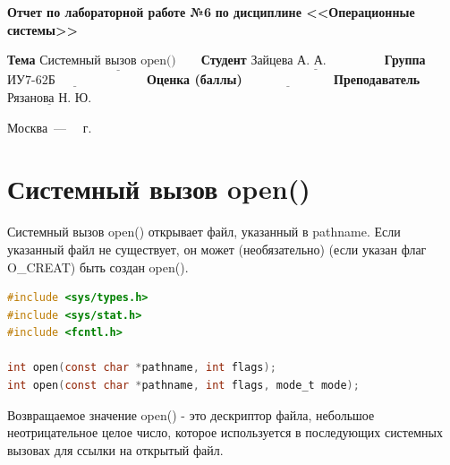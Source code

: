 \documentclass[a4paper,14pt]{extreport}
\begin{document}
\begin{titlepage}
		\begin{center}
			\noindent\begin{minipage}{1.1\textwidth}\centering
				\Large\textbf{  Отчет по лабораторной работе №6}\newline
				\textbf{по дисциплине <<Операционные системы>>}\newline
			\end{minipage}
		\end{center}
		
		\noindent\textbf{Тема} $\underline{\text{Системный вызов open()~~~~~}}$\newline\newline
		\noindent\textbf{Студент} $\underline{\text{Зайцева А. А.~~~~~~~~~~~~~}}$\newline\newline
		\noindent\textbf{Группа} $\underline{\text{ИУ7-62Б~~~~~~~~~~~~~~~~~~~~~}}$\newline\newline
		\noindent\textbf{Оценка (баллы)} $\underline{\text{~~~~~~~~~~~~~~~~~~~~}}$\newline\newline
		\noindent\textbf{Преподаватель} $\underline{\text{Рязанова Н. Ю.}}$\newline\newline\newline
		
		\begin{center}
			\vfill
			Москва~---~\the\year
			~г.
		\end{center}
	\end{titlepage}


\chapter{Системный вызов open()}

Системный вызов open() открывает файл, указанный в pathname. Если указанный файл не существует, он может (необязательно) (если указан флаг O\_CREAT) быть создан open().

\begin{lstlisting}[language=c, caption=Системный вызов open()]
#include <sys/types.h>
#include <sys/stat.h>
#include <fcntl.h>

int open(const char *pathname, int flags);
int open(const char *pathname, int flags, mode_t mode);
\end{lstlisting}

Возвращаемое значение open() - это дескриптор файла, небольшое неотрицательное целое число, которое используется в последующих системных вызовах для ссылки на открытый файл.
\end{document}
